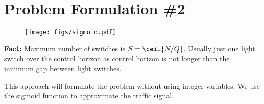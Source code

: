 




\section{Problem Formulation \#2}

\begin{figure}
\centering
\texttt{[image: figs/sigmoid.pdf]}
\end{figure}

\textbf{Fact:} Maximum number of switches is $S = \ceil{N/Q}$. Usually just one light switch over the control horizon as control horizon is not longer than the minimum gap between light switches.

This approach will formulate the problem without using integer variables.
We use the sigmoid function to approximate the traffic signal.

